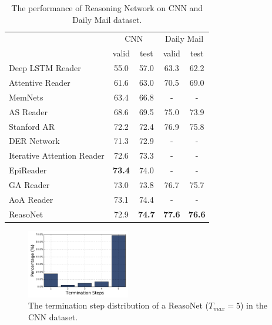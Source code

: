 \documentclass[sigconf]{acmart}
\begin{document}
\begin{table}%
	\centering
	{\small 	
		\caption{{The performance of Reasoning Network on CNN and Daily Mail dataset.}}
		\label{tab:cnn_dm_table}
		\begin{tabular}{lcccc}
			\toprule
			& \multicolumn{2}{c}{CNN}  &  \multicolumn{2}{c}{Daily Mail} \\
			\cmidrule{1-5}
			& valid & test & valid & test \\
			{Deep LSTM Reader \citep{HermannNIPS2015}} & 55.0 & 57.0 & 63.3 & 62.2 \\    
			{Attentive Reader \citep{HermannNIPS2015}} & 61.6 & 63.0 & 70.5 & 69.0 \\
			{MemNets \citep{HillICLR2016}} 		  & 63.4 & 66.8 & -    & - 	  \\
			{AS Reader \citep{KadlecAttentionSum2016}} 	      & 68.6 & 69.5 & 75.0 & 73.9 \\
			{Stanford AR \citep{ChenACL2016}}      & 72.2 & 72.4 & 76.9 & 75.8 \\ 
			{DER Network \citep{Kobayashi2016a}} & 71.3 & 72.9 & - & - \\
			{Iterative Attention Reader \citep{Sordoni2016IterativeAtt}} & 72.6 & 73.3 & - & -  \\
			{EpiReader \citep{Trischler2016EpiReader}} & \textbf{73.4} & 74.0 & - & - \\
			{GA Reader \citep{Dhingra2016Gated}} & 73.0 & 73.8 &  76.7 & 75.7  \\
			{AoA Reader \citep{Cui2016AoA}} & 73.1 & 74.4 & - & - \\
			{ReasoNet} &  72.9 & \textbf{74.7} & \textbf{77.6} & \textbf{76.6}  \\    
			\bottomrule
		\end{tabular}
	}
\end{table}


\begin{figure}[th!]
	\centering
	\includegraphics[width=0.4\textwidth]{figure/cnn_histogram}
	\caption{{The termination step distribution of a ReasoNet ($T_{max}=5$) in the CNN dataset.}}
	\label{fig:cnntsdistr}
\end{figure}
\end{document}
